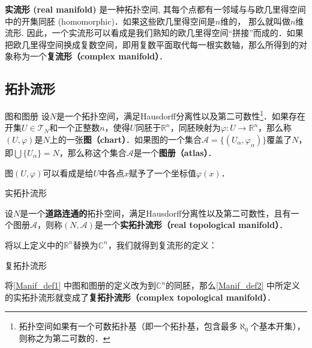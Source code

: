 


\textbf{实流形 (real manifold)} 是一种拓扑空间, 其每个点都有一邻域与与欧几里得空间中的开集同胚 (homomorphic)．如果这些欧几里得空间是$n$维的， 那么就叫做$n$维流形. 因此，一个实流形可以看成是我们熟知的欧几里得空间“拼接”而成的．如果把欧几里得空间换成复数空间，即用复数平面取代每一根实数轴，那么所得到的对象称为一个\textbf{复流形（complex manifold）}．

\subsection{拓扑流形}

\begin{definition}{图和图册}\label{Manif_def1}
设$N$是一个拓扑空间，满足Hausdorff分离性以及第二可数性\footnote{拓扑空间如果有一个可数拓扑基（即一个拓扑基，包含最多$\aleph_0$个基本开集），则称之为第二可数的．}．如果存在开集$U\in\mathcal{T}_N$和一个正整数$n$，使得$U$同胚于$\mathbb{R}^n$，同胚映射为$\varphi:U\rightarrow\mathbb{R}^n$，那么称$(U,\varphi)$是$N$上的一张\textbf{图（chart）}．如果图的一个集合$\mathcal{A}=\{(U_\alpha, \varphi_\alpha)\}$覆盖了$N$，即$\bigcup\{U_\alpha\}=N$，那么称这个集合$\mathcal{A}$是一个\textbf{图册（atlas）}．
\end{definition}

图$(U, \varphi)$可以看成是给$U$中各点$x$赋予了一个坐标值$\varphi(x)$．

\begin{definition}{实拓扑流形}\label{Manif_def2}

设$N$是一个\textbf{道路连通的}拓扑空间，满足Hausdorff分离性以及第二可数性，且有一个图册$\mathcal{A}$，则称$(N, \mathcal{A})$是一个\textbf{实拓扑流形（real topological manifold）}．

\end{definition}

将以上定义中的$\mathbb{R}^n$替换为$\mathbb{C}^n$，我们就得到复流形的定义：

\begin{definition}{复拓扑流形}

将\autoref{Manif_def1} 中图和图册的定义改为到$\mathbb{C}^n$的同胚，那么\autoref{Manif_def2} 中所定义的实拓扑流形就变成了\textbf{复拓扑流形（complex topological manifold）}．

\end{definition}

